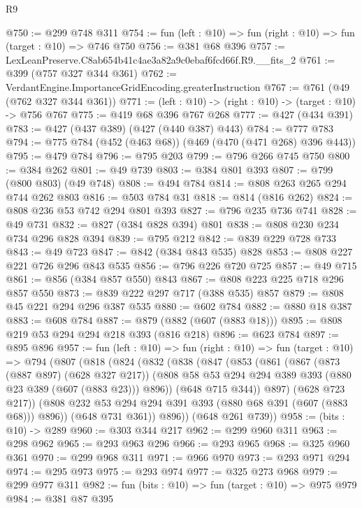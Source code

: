 \begin{lexlean}{R9}
\begin{coremodule}
@750 := @299 @748 @311
@754 := fun (left : @10) => fun (right : @10) => fun (target : @10) => @746 @750
@756 := @381 @68 @396
@757 := LexLeanPreserve.C8ab654b41c4ae3a82a9c0ebaf6fcd66f.R9.__fits_2
@761 := @399 (@757 @327 @344 @361)
@762 := VerdantEngine.ImportanceGridEncoding.greaterInstruction
@767 := @761 (@49 (@762 @327 @344 @361))
@771 := (left : @10) -> (right : @10) -> (target : @10) -> @756 @767
@775 := @419 @68 @396 @767 @268
@777 := @427 (@434 @391)
@783 := @427 (@437 @389) (@427 (@440 @387) @443)
@784 := @777 @783
@794 := @775 @784 (@452 (@463 @68)) (@469 (@470 (@471 @268) @396 @443))
@795 := @479 @784
@796 := @795 @203
@799 := @796 @266 @745 @750
@800 := @384 @262
@801 := @49 @739
@803 := @384 @801 @393
@807 := @799 (@800 @803) (@49 @748)
@808 := @494 @784
@814 := @808 @263 @265 @294 @744 @262 @803
@816 := @503 @784 @31
@818 := @814 (@816 @262)
@824 := @808 @236 @53 @742 @294 @801 @393
@827 := @796 @235 @736 @741
@828 := @49 @731
@832 := @827 (@384 @828 @394) @801
@838 := @808 @230 @234 @734 @296 @828 @394
@839 := @795 @212
@842 := @839 @229 @728 @733
@843 := @49 @723
@847 := @842 (@384 @843 @535) @828
@853 := @808 @227 @221 @726 @296 @843 @535
@856 := @796 @226 @720 @725
@857 := @49 @715
@861 := @856 (@384 @857 @550) @843
@867 := @808 @223 @225 @718 @296 @857 @550
@873 := @839 @222 @297 @717 (@388 @535) @857
@879 := @808 @45 @221 @294 @296 @387 @535
@880 := @602 @784
@882 := @880 @18 @387
@883 := @608 @784
@887 := @879 (@882 (@607 (@883 @18)))
@895 := @808 @219 @53 @294 @294 @218 @393 (@816 @218)
@896 := @623 @784
@897 := @895 @896
@957 := fun (left : @10) =>
  fun (right : @10) =>
  fun (target : @10) =>
  @794
    (@807
      (@818
        (@824
          (@832
            (@838
              (@847
                (@853
                  (@861
                    (@867
                      (@873 (@887 @897) (@628 @327 @217))
                      (@808 @58 @53 @294 @294 @389 @393 (@880 @23 @389 (@607 (@883 @23))) @896))
                    (@648 @715 @344))
                  @897)
                (@628 @723 @217))
              (@808 @232 @53 @294 @294 @391 @393 (@880 @68 @391 (@607 (@883 @68))) @896))
            (@648 @731 @361))
          @896))
      (@648 @261 @739))
@958 := (bits : @10) -> @289
@960 := @303 @344 @217
@962 := @299 @960 @311
@963 := @298 @962
@965 := @293 @963 @296
@966 := @293 @965
@968 := @325 @960 @361
@970 := @299 @968 @311
@971 := @966 @970
@973 := @293 @971 @294
@974 := @295 @973
@975 := @293 @974
@977 := @325 @273 @968
@979 := @299 @977 @311
@982 := fun (bits : @10) => fun (target : @10) => @975 @979
@984 := @381 @87 @395

\end{coremodule}
\end{lexlean}
